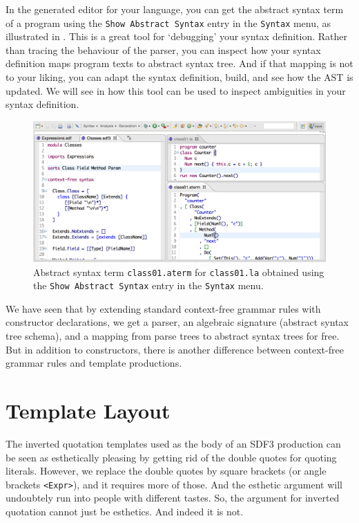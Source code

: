 In the generated editor for your language, you can get the abstract syntax term
of a program using the \texttt{Show Abstract Syntax} entry in the
\texttt{Syntax} menu, as illustrated in .
This is a great tool for `debugging' your syntax definition. Rather than tracing
the behaviour of the parser, you can inspect how your syntax definition maps
program texts to abstract syntax tree. And if that mapping is not to your
liking, you can adapt the syntax definition, build, and see how the AST is
updated. We will see in  how this tool can be used to
inspect ambiguities in your syntax definition.

\begin{figure}[t]
\includegraphics[width=\hsize]{syntax/class01-abstract-syntax.pdf}
\caption{Abstract syntax term \texttt{class01.aterm} for \texttt{class01.la}
obtained using the \texttt{Show Abstract Syntax} entry in the \texttt{Syntax}
menu.}
\end{figure}
 

We have seen that by extending standard context-free grammar rules with
constructor declarations, we get a parser, an algebraic signature (abstract
syntax tree schema), and a mapping from parse trees to abstract syntax trees for
free. But in addition to constructors, there is another difference between
context-free grammar rules and template productions.

\section{Template Layout}

The inverted quotation templates used as the body of an SDF3 production can be
seen as esthetically pleasing by getting rid of the double quotes for quoting
literals. However, we replace the double quotes by square brackets (or angle
brackets \texttt{<Expr>}), and it requires more of those. And the esthetic
argument will undoubtely run into people with different tastes. So, the argument
for inverted quotation cannot just be esthetics. And indeed it is not.

